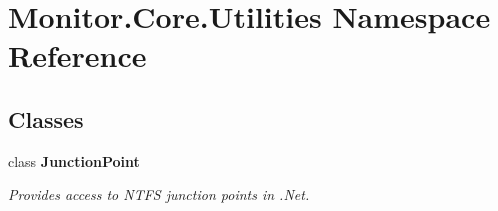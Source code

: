 \hypertarget{namespace_monitor_1_1_core_1_1_utilities}{}\section{Monitor.\+Core.\+Utilities Namespace Reference}
\label{namespace_monitor_1_1_core_1_1_utilities}
\subsection*{Classes}
\begin{DoxyCompactItemize}
\item 
class {\bfseries Junction\+Point}
\begin{DoxyCompactList}\small\item\em Provides access to N\+T\+FS junction points in .Net. \end{DoxyCompactList}\end{DoxyCompactItemize}
